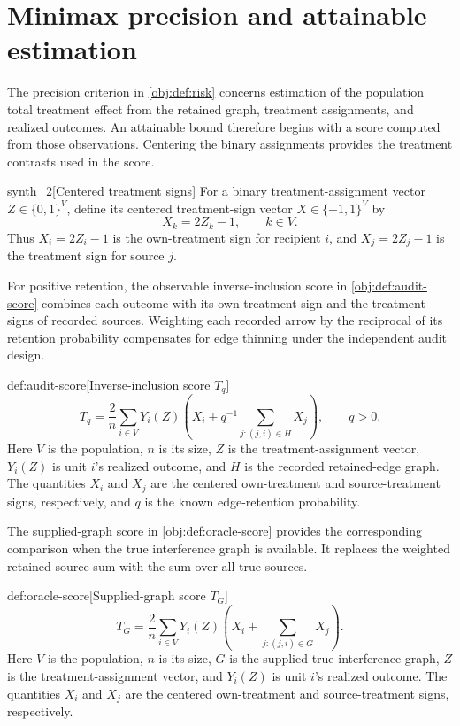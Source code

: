 \section{Minimax precision and attainable estimation}

The precision criterion in \cref{obj:def:risk} concerns estimation of the population total treatment effect from the retained graph, treatment assignments, and realized outcomes. An attainable bound therefore begins with a score computed from those observations. Centering the binary assignments provides the treatment contrasts used in the score.

\begin{definitionv}{synth_2}[Centered treatment signs]
For a binary treatment-assignment vector \(Z\in\{0,1\}^V\), define its centered treatment-sign vector \(X\in\{-1,1\}^V\) by
\[
X_k=2Z_k-1,\qquad k\in V.
\]
Thus \(X_i=2Z_i-1\) is the own-treatment sign for recipient \(i\), and \(X_j=2Z_j-1\) is the treatment sign for source \(j\).
\end{definitionv}

For positive retention, the observable inverse-inclusion score  in \cref{obj:def:audit-score} combines each outcome with its own-treatment sign and the treatment signs of recorded sources. Weighting each recorded arrow by the reciprocal of its retention probability compensates for edge thinning under the independent audit design.

\begin{definitionv}{def:audit-score}[Inverse-inclusion score $T_q$]
\[
T_q
=
\frac2n\sum_{i\in V}Y_i(Z)
\left(X_i+q^{-1}\sum_{j:(j,i)\in H}X_j\right),
\qquad q>0.
\]
Here \(V\) is the population, \(n\) is its size, \(Z\) is the treatment-assignment vector, \(Y_i(Z)\) is unit \(i\)'s realized outcome, and \(H\) is the recorded retained-edge graph. The quantities \(X_i\) and \(X_j\) are the centered own-treatment and source-treatment signs, respectively, and \(q\) is the known edge-retention probability.
\end{definitionv}

The supplied-graph score  in \cref{obj:def:oracle-score} provides the corresponding comparison when the true interference graph is available. It replaces the weighted retained-source sum with the sum over all true sources.

\begin{definitionv}{def:oracle-score}[Supplied-graph score $T_G$]
\[
T_G
=
\frac2n\sum_{i\in V}Y_i(Z)
\left(X_i+\sum_{j:(j,i)\in G}X_j\right).
\]
Here \(V\) is the population, \(n\) is its size, \(G\) is the supplied true interference graph, \(Z\) is the treatment-assignment vector, and \(Y_i(Z)\) is unit \(i\)'s realized outcome. The quantities \(X_i\) and \(X_j\) are the centered own-treatment and source-treatment signs, respectively.
\end{definitionv}

